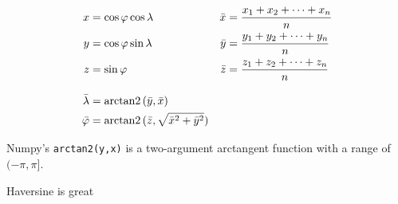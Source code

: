 \begin{align}
x &= \cos \varphi \cos \lambda & \bar{x} &= \frac{x_1 + x_2 + \cdots + x_n}{n} \\
y &= \cos \varphi \sin \lambda & \bar{y} &= \frac{y_1 + y_2 + \cdots + y_n}{n} \\
z &= \sin \varphi & \bar{z} &= \frac{z_1 + z_2 + \cdots + z_n}{n} \\[2ex]
\bar{\lambda} &= \operatorname{arctan2}{(\bar{y},\bar{x})} \\
\bar{\varphi} &= \operatorname{arctan2}{(\bar{z}, \sqrt{\bar{x}^2 + \bar{y}^2})}
\end{align}

Numpy's \texttt{arctan2(y,x)} is a two-argument arctangent function with a range of $(-\pi, \pi]$.

Haversine is great \cite{sinnott_virtues_1984}

